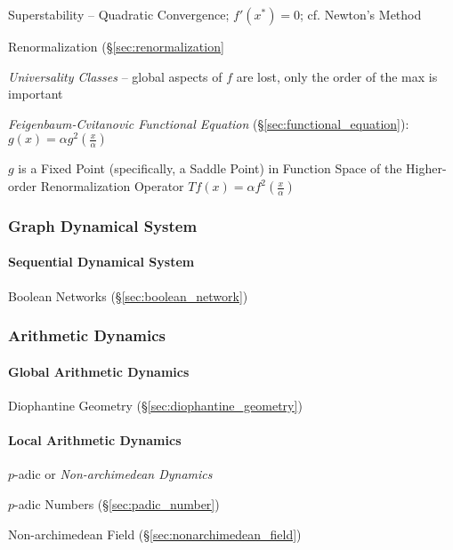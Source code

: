 Superstability -- Quadratic Convergence; $f'(x^*) = 0$; cf. Newton's Method

Renormalization (\S\ref{sec:renormalization}

\emph{Universality Classes} -- global aspects of $f$ are lost, only the order of
the max is important

\emph{Feigenbaum-Cvitanovic Functional Equation}
(\S\ref{sec:functional_equation}): $g(x) = \alpha g^2(\frac{x}{\alpha})$

$g$ is a Fixed Point (specifically, a Saddle Point) in Function Space of the
Higher-order Renormalization Operator $T f(x) = \alpha f^2(\frac{x}{\alpha})$



\subsubsection{Graph Dynamical System}\label{sec:graph_dynamical_system}

\paragraph{Sequential Dynamical System}
\label{sec:sequential_dynamical_system}\hfill

\fist Boolean Networks (\S\ref{sec:boolean_network})



\subsubsection{Arithmetic Dynamics}\label{sec:arithmetic_dynamics}

\paragraph{Global Arithmetic Dynamics}\label{sec:global_arithmetic_dynamics}
\hfill

Diophantine Geometry (\S\ref{sec:diophantine_geometry})



\paragraph{Local Arithmetic Dynamics}\label{sec:local_arithmetic_dynamics}
\hfill

$p$-adic or \emph{Non-archimedean Dynamics}

$p$-adic Numbers (\S\ref{sec:padic_number})

Non-archimedean Field (\S\ref{sec:nonarchimedean_field})



